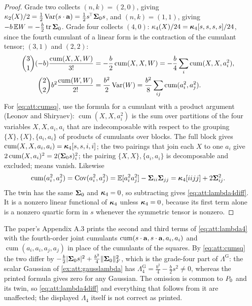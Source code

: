 \begin{proof}
Grade two collects $(n,k)=(2,0)$, giving $\kappa_2(X)/2=\tfrac12\operatorname{Var}(s\cdot\mathbf{a})=\tfrac12s^{\!\top}\mathbf{\Sigma}_0s$,
and $(n,k)=(1,1)$, giving $-b\,\mathbb{E} W=-\tfrac b2\operatorname{tr}\mathbf{\Sigma}_0$. Grade four collects
$(4,0)$: $\kappa_4(X)/24=\bm{\kappa}_4[s,s,s,s]/24$, since the fourth cumulant of a linear form
is the contraction of the cumulant tensor; $(3,1)$ and $(2,2)$:
\begin{align*}
  \binom31(-b)\frac{\operatorname{cum}(X,X,W)}{3!}&=-\frac b2\operatorname{cum}(X,X,W)=-\frac b4\sum_i\operatorname{cum}(X,X,a_i^2),\\
  \binom22b^2\frac{\operatorname{cum}(W,W)}{2!}&=\frac{b^2}2\operatorname{Var}(W)=\frac{b^2}8\sum_{ij}\operatorname{cum}(a_i^2,a_j^2).
\end{align*}
For \cref{eq:att:cumsq}, use the formula for a cumulant with a product argument
(Leonov and Shiryaev): $\operatorname{cum}(X,X,a_i^2)$ is the sum over partitions of
the four variables $X,X,a_i,a_i$ that are indecomposable with respect to the grouping
$\{X\},\{X\},\{a_i,a_i\}$ of products of cumulants over blocks. The full block gives
$\operatorname{cum}(X,X,a_i,a_i)=\bm{\kappa}_4[s,s,i,i]$; the two pairings that join each $X$
to one $a_i$ give $2\operatorname{cum}(X,a_i)^2=2(\mathbf{\Sigma}_0s)_i^2$; the pairing
$\{X,X\},\{a_i,a_i\}$ is decomposable and excluded; means vanish. Likewise
\[
  \operatorname{cum}(a_i^2,a_j^2)=\operatorname{Cov}(a_i^2,a_j^2)=\mathbb{E}[a_i^2a_j^2]-\mathbf{\Sigma}_{ii}\mathbf{\Sigma}_{jj}=\bm{\kappa}_4[iijj]+2\mathbf{\Sigma}_{ij}^2 .
\]
The twin has the same $\mathbf{\Sigma}_0$ and $\bm{\kappa}_4=0$, so subtracting gives
\cref{eq:att:lambda4diff}. It is a nonzero linear functional of $\bm{\kappa}_4$ unless
$\bm{\kappa}_4=0$, because its first term alone is a nonzero quartic form in $s$ whenever the
symmetric tensor is nonzero.
\end{proof}

\begin{remark}
\label{rem:att:lambda4}
The paper's Appendix A.3 prints the second and third terms of \cref{eq:att:lambda4}
with the fourth-order joint cumulants $\operatorname{cum}(s\cdot\mathbf{a},s\cdot\mathbf{a},a_i,a_i)$
and $\operatorname{cum}(a_i,a_i,a_j,a_j)$ in place of the cumulants of the squares.
By \cref{eq:att:cumsq} the two differ by $-\tfrac b2|\mathbf{\Sigma}_0s|^2+\tfrac{b^2}4\lVert \mathbf{\Sigma}_0 \rVert_{F}^2$,
which is the grade-four part of $\Lambda^{\mathrm G}$: the scalar Gaussian of
\cref{ex:att:gausslambda} has $\Lambda^{\mathrm G}_4=\tfrac{b^2}4-\tfrac{b}2s^2\ne0$,
whereas the printed formula gives zero for any Gaussian. The omission is common to
$P_0$ and its twin, so \cref{eq:att:lambda4diff} and everything that follows from it
are unaffected; the displayed $\Lambda_4$ itself is not correct as printed.
\end{remark}

